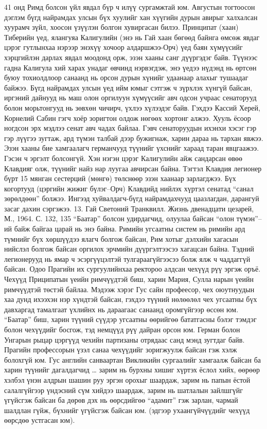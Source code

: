 41 онд Римд болсон үйл явдал бүр ч илүү сургамжтай юм. Августын тогтоосон дэглэм бүгд найрамдах улсын бүх хуулийг хан хүүгийн дурын авирыг халхалсан хуурамч зүйл, хоосон үзүүлэн болгон хувиргасан билээ. Принципат (хаан) Тиберийн үед, ялангуяа Калигулийн (энэ нь Гай хаан бөгөөд байнга өмсөж явдаг цэрэг гутлынхаа нэрээр энэхүү хочоор алдаршжээ-Орч) үед баян хүмүүсийг хэрцгийлэн дарлах явдал моодонд орж, эзэн хааны санг дүүргэдэг байв. Түүнээс гадна Калигула хий харах унадаг өвчинд нэрвэгдэж, энэ үедээ нүдэнд нь өртсөн буюу тохиолдлоор санаанд нь орсон дурын хүнийг удаанаар алахыг тушаадаг байжээ. Бүгд найрамдах улсын үед ийм юмыг сэтгэж ч зүрхлэх хүнгүй байсан, иргэний дайнууд нь маш олон оргилуун хүмүүсийг авч одсон учраас сенаторууд болон морьтонгууд нь зөвхөн чичирч, үхлээ хүлээдэг байв. Гэхдээ Кассий Херей, Корнелий Сабин гэгч хоёр зоригтон олдож нөгөөх хортонг алжээ. Хууль ёсоор ногдсон эрх мэдлээ сенат авч чадах байлаа. Гэвч сенаторуудын ихэнхи хэсэг гэр гэр лүүгээ зугтаж, ард түмэн талбай дээр бужигнаж, харин дараа нь тархан явжээ. Эзэн хааны бие хамгаалагч германчууд түүнийг үхснийг хараад таран явцгаажээ. Гэсэн ч эргэлт болсонгүй.
Хэн нэгэн цэрэг Калигулийн айж сандарсан өвөө Клавдияг олж, түүнийг найз нар луугаа авчирсан байна. Тэгтэл Клавдия легионер бүрт 15 мянган сестерций (мөнгө) төлснөөр эзэн хаанаар зарлагджээ. Бүх когортууд (цэргийн жижиг бүлэг–Орч) Клавдийд нийлэх хүртэл сенатад “санал зөрөлдөөн” болжээ. Ингээд хуйвалдагч-бүгд найрамдахчууд цаазлагдан, дарангуй засаг дахин сэргэжээ. 13. Гай Светоний Транквилл. Жизнь двенадцати цезарей, М., 1964. С. 132, 135
“Баатар” болсон удирдагчид, олуулаа байсан “олон түмэн”–ий байж байгаа царай нь энэ байна. Римийн угсаатны систем нь римийн ард түмнийг бүх хөршүүдээ ялагч болгож байсан, Рим хотыг дэлхийн хагасын нийслэл болгож байсан оргилох эрчмийн дүүргэлтээсээ хагацсан байна. Тэдний легионерууд нь ямар ч эсэргүүцэлтэй тулгараагүйгээсээ болж ялж ч чаддаггүй байсан.
Одоо Прагийн их сургуулийнхаа ректороо алдсан чехүүд рүү эргэж оръё. Чехүүд Приципатын үеийн римчүүдтэй биш, харин Мария, Сулла нарын үеийн римчүүдтэй төстэй байлаа. Мэдээж хэрэг Гус сайн профеесор, чех оюутнуудын хаа дунд ихээхэн нэр хүндтэй байсан, гэхдээ түүний нөлөөлөл чех угсаатны бүх давхаргад тамалгаат үхлийнх нь дараагаас санаанд оромгүйгээр өссөн юм. “Баатар” биш, харин түүний сүүдэр угсаатны өөрийгөө бататгасны бэлэг тэмдэг болон чехүүдийг босгож, тэд немцүүд рүү дайран орсон юм. Герман болон Унгарын рыцар цэргүүд чехийн партизаны отрядаас санд мэнд зугтдаг байв. Прагийн профессорын үзэл санаа чехүүдийг зоригжуулж байсан гэж хэлж болохгүй юм. Гус английн санваартан Викликийн сургаалийг хамгаалж байсан ба харин түүнийг дагалдагчид … зарим нь бурхны хишиг хүртэх ёслол хийх, өөрөөр хэлбэл үнэн алдрын шашин руу эргэн орохыг шаардаж, зарим нь папын ёстой салалгүйгээр үндэсний сүм хийдээ шаардаж, зарим нь шатлалын зайлшгүйг үгүйсгэж байсан ба дөрөв дэх нь өөрсдийгөө “адамит” гэж зарлан, чармай шалдлан гүйж, бүхнийг үгүйсгэж байсан юм. (эдгээр ухаангүйчүүдийг чехүүд өөрсдөө устгасан юм).
